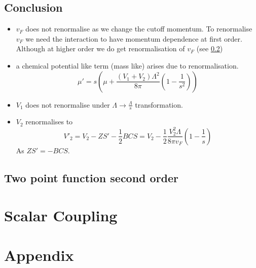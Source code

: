 \documentclass[a4paper]{article}
\begin{document}
    \subsection{Conclusion}
        \begin{itemize}
            \item $v_F$ does not renormalise as we change the cutoff momentum. To renormalise $v_F$ we need the interaction to have momentum dependence at first order. Although at higher order we do get renormalisation of $v_F$ (see \ref{two_point_second_order}) 
            \item a chemical potential like term (mass like) arises due to renormalisation.
            \begin{equation}
                \mu' = s\left( \mu + \frac{(V_1+V_2)\Lambda^2}{8\pi}\left(1 - \frac{1}{s^2} \right) \right){}
            \end{equation}
            \item $V_1$ does not renormalise under $\Lambda \to \frac{\Lambda}{s}$ transformation.
            \item $V_2$ renormalises to
            \begin{equation}
                V'_2 = V_2 - ZS' - \frac{1}{2}BCS
                     = V_2 -\frac{1}{2}\frac{V^2_2\Lambda}{8\pi v_F}\left(1- \frac{1}{s}\right)
            \end{equation}
            As $ZS' = - BCS$.

        \end{itemize}
    \subsection{Two point function second order}\label{two_point_second_order}
        
    \section{Scalar Coupling}
        
    \section{Appendix}
        
\end{document}

